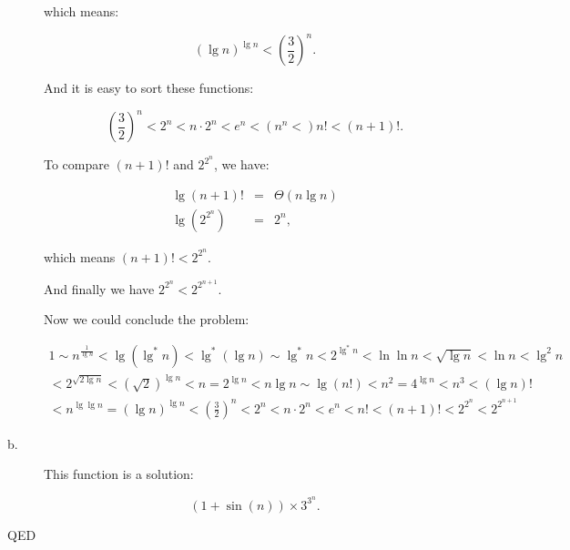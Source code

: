 \documentclass{article}
\newcommand{\qed}{ QED}
\begin{document}
\begin{description}
which means:

$$ (\lg n)^{\lg n} < \left(\frac{3}{2}\right) ^ n.$$

And it is easy to sort these functions:

$$ \left(\frac{3}{2}\right)^n < 2^n < n \cdot 2^n < e^n < ( n^n  <) n!  < (n + 1)!.$$

To compare $(n + 1)!$ and $2^{2^n}$, we have:

\begin{eqnarray*}
\lg (n + 1)! &=& \Theta(n \lg n)\\
\lg \left(2^{2^n}\right) &=& 2^n,
\end{eqnarray*}

which means $(n + 1)! < 2^{2^n}$.

And finally we have $2^{2^n} < 2^{2^{n + 1}}$.

Now we could conclude the problem:

\begin{eqnarray*}
1 \sim n^{\frac{1}{\lg n}} < \lg \left(\lg^*n\right) < \lg^*\left(\lg n\right) \sim \lg^* n < 2^{\lg^* n} < \ln\ln n < \sqrt{\lg n} < \ln n < \lg^2 n\\
< 2^{\sqrt{2\lg n}} < \left(\sqrt 2\right) ^ {\lg n} < n = 2^{\lg n}  < n\lg n \sim \lg \left(n!\right) < n^2 = 4^{\lg n}< n^3  < (\lg n)!\\
< n^{\lg \lg n} = \left(\lg n \right)^{\lg n} < \left(\frac{3}{2}\right)^n < 2^n < n\cdot 2^n < e^n < n! < (n + 1)! < 2^{2^n} < 2^{2^{n + 1}}
\end{eqnarray*}

\item[b. \hspace{9pt}] This function is a solution:

$$(1 + \sin(n)) \times 3^{3^n}.$$

\end{description}
\qed
\end{document}
